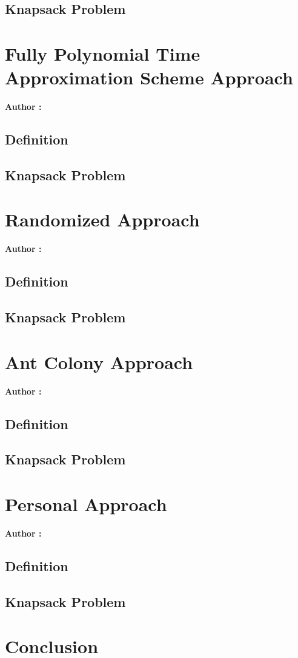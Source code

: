 \documentclass[12pt]{article}
\begin{document}
    \subsection{Knapsack Problem}

\section{Fully Polynomial Time Approximation Scheme Approach}

    \textbf{Author :} 

    \subsection{Definition}
    
    \subsection{Knapsack Problem}

\section{Randomized Approach}

    \textbf{Author :}

    \subsection{Definition}
    
    \subsection{Knapsack Problem}

\section{Ant Colony Approach}

    \textbf{Author :}

    \subsection{Definition}
    
    \subsection{Knapsack Problem}

\section{Personal Approach}

    \textbf{Author :}

    \subsection{Definition}
    
    \subsection{Knapsack Problem}

\section{Conclusion}
\end{document}
